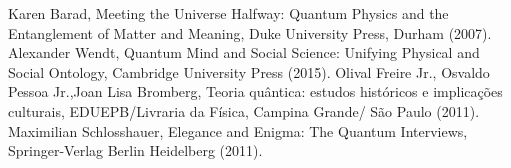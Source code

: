 \documentclass[onecolumn,preprintnumbers,amsmath,amssymbn,reprint,nofootinbib,superscriptaddress]{revtex4}    %
\begin{document}
\begin{thebibliography}{}
%
%

Karen Barad, Meeting the Universe Halfway:  Quantum Physics and the Entanglement of Matter and Meaning, Duke University Press, Durham (2007).
 Alexander Wendt, Quantum Mind and Social Science: Unifying Physical and Social Ontology, Cambridge University Press (2015).
Olival Freire Jr., Osvaldo Pessoa Jr.,Joan Lisa Bromberg, Teoria quântica:
estudos históricos e implicações culturais, EDUEPB/Livraria da F\'isica, Campina Grande/ São Paulo (2011).
Maximilian Schlosshauer, Elegance and Enigma: The Quantum Interviews, Springer-Verlag Berlin Heidelberg (2011).
 

\end{thebibliography}
\end{document}

